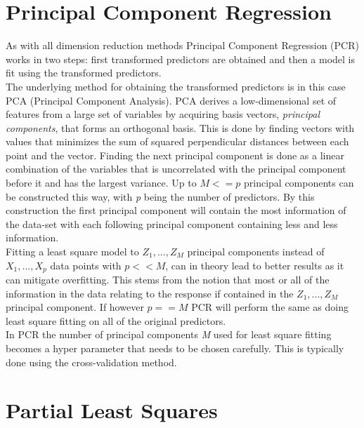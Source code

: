 \section{Principal Component Regression}
As with all dimension reduction methods Principal Component Regression (PCR) works in two steps: first transformed predictors are obtained and then a model is fit using the transformed predictors.\\
The underlying method for obtaining the transformed predictors is in this case PCA (Principal Component Analysis).
PCA derives a low-dimensional set of features from a large set of variables by acquiring basis vectors, \emph{principal components}, that forms an orthogonal basis. This is done by finding vectors with values that minimizes the sum of squared perpendicular distances between each point and the vector. Finding the next principal component is done as a linear combination of the variables that is uncorrelated with the principal component before it and has the largest variance. Up to \(M <= p\) principal components can be constructed this way, with \emph{p} being the number of predictors. By this construction the first principal component will contain the most information of the data-set with each following principal component containing less and less information.\\
Fitting a least square model to \(Z_1,...,Z_M\) principal components instead of \(X_1,...,X_p\) data points with \(p << M\), can in theory lead to better results as it can mitigate overfitting. This stems from the notion that most or all of the information in the data relating to the response if contained in the \(Z_1,...,Z_M\) principal component. If however \(p == M\) PCR will perform the same as doing least square fitting on all of the original predictors.\\
In PCR the number of principal components \emph{M} used for least square fitting becomes a hyper parameter that needs to be chosen carefully. This is typically done using the cross-validation method.


\section{Partial Least Squares}